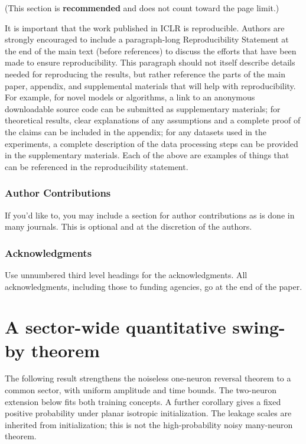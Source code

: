 \documentclass{article} %
\theoremstyle{plain}
\theoremstyle{definition}
\theoremstyle{remark}
\begin{document}
(This section is \textbf{recommended} and does not count toward the page limit.)

It is important that the work published in ICLR is reproducible. Authors are
strongly encouraged to include a paragraph-long Reproducibility Statement at the
end of the main text (before references) to discuss the efforts that have been
made to ensure reproducibility. This paragraph should not itself describe
details needed for reproducing the results, but rather reference the parts of
the main paper, appendix, and supplemental materials that will help with
reproducibility. For example, for novel models or algorithms, a link to an
anonymous downloadable source code can be submitted as supplementary materials;
for theoretical results, clear explanations of any assumptions and a complete
proof of the claims can be included in the appendix; for any datasets used in
the experiments, a complete description of the data processing steps can be
provided in the supplementary materials. Each of the above are examples of
things that can be referenced in the reproducibility statement.

\subsubsection*{Author Contributions}
If you'd like to, you may include  a section for author contributions as is done
in many journals. This is optional and at the discretion of the authors.

\subsubsection*{Acknowledgments}
Use unnumbered third level headings for the acknowledgments. All
acknowledgments, including those to funding agencies, go at the end of the paper.


\section{A sector-wide quantitative swing-by theorem}
\label{sbsector:main}

The following result strengthens the noiseless one-neuron reversal
theorem to a common sector, with uniform amplitude and time bounds.
The two-neuron extension below fits both training concepts. A further
corollary gives a fixed positive probability under planar isotropic
initialization. The leakage scales are inherited from initialization;
this is not the high-probability noisy many-neuron theorem.
\end{document}
